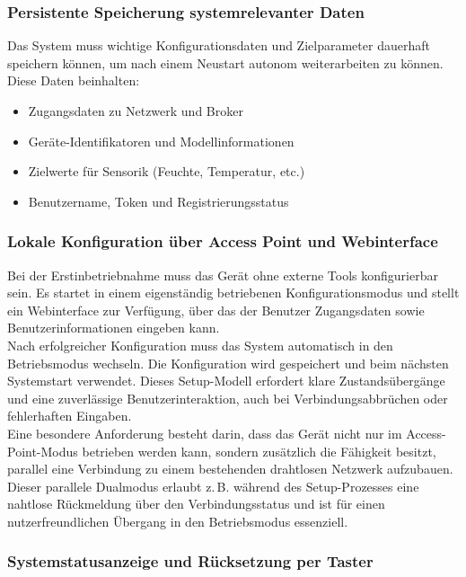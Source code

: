\subsubsection{Persistente Speicherung systemrelevanter Daten}

Das System muss wichtige Konfigurationsdaten und Zielparameter dauerhaft speichern können, um nach einem Neustart autonom weiterarbeiten zu können. Diese Daten beinhalten:

\begin{itemize}
	\item Zugangsdaten zu Netzwerk und Broker
	\item Geräte-Identifikatoren und Modellinformationen
	\item Zielwerte für Sensorik (Feuchte, Temperatur, etc.)
	\item Benutzername, Token und Registrierungsstatus
\end{itemize}

\subsubsection{Lokale Konfiguration über Access Point und Webinterface}

Bei der Erstinbetriebnahme muss das Gerät ohne externe Tools konfigurierbar sein. Es startet in einem eigenständig betriebenen Konfigurationsmodus und stellt ein Webinterface zur Verfügung, über das der Benutzer Zugangsdaten sowie Benutzerinformationen eingeben kann.
\\
Nach erfolgreicher Konfiguration muss das System automatisch in den Betriebsmodus wechseln. Die Konfiguration wird gespeichert und beim nächsten Systemstart verwendet. Dieses Setup-Modell erfordert klare Zustandsübergänge und eine zuverlässige Benutzerinteraktion, auch bei Verbindungsabbrüchen oder fehlerhaften Eingaben.
\\
Eine besondere Anforderung besteht darin, dass das Gerät nicht nur im Access-Point-Modus betrieben werden kann, sondern zusätzlich die Fähigkeit besitzt, parallel eine Verbindung zu einem bestehenden drahtlosen Netzwerk aufzubauen. Dieser parallele Dualmodus erlaubt z.\,B. während des Setup-Prozesses eine nahtlose Rückmeldung über den Verbindungsstatus und ist für einen nutzerfreundlichen Übergang in den Betriebsmodus essenziell.

\subsubsection{Systemstatusanzeige und Rücksetzung per Taster}

